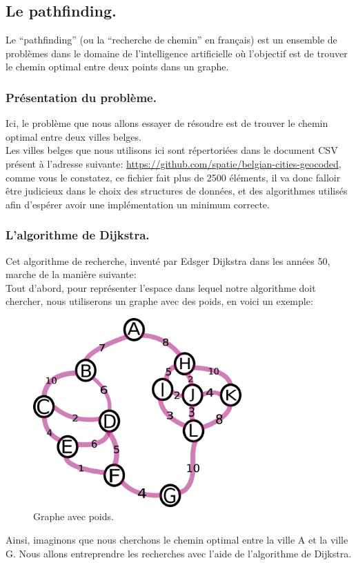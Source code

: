 \documentclass[a4paper, 12pt]{article}
\numberwithin{equation}{subsection}
\begin{document}
\subsection{Le pathfinding.}
Le ``pathfinding'' (ou la ``recherche de chemin'' en français) est un ensemble de problèmes dans le domaine de l'intelligence artificielle où l'objectif est de trouver le chemin optimal entre deux points dans un graphe. \\
\subsubsection{Présentation du problème.}
Ici, le problème que nous allons essayer de résoudre est de trouver le chemin optimal entre deux villes belges. \\

Les villes belges que nous utilisons ici sont répertoriées dans le document CSV présent à l'adresse suivante: \url{https://github.com/spatie/belgian-cities-geocoded},
comme vous le constatez, ce fichier fait plus de 2500 éléments, il va donc falloir être judicieux dans le choix des structures de données, et des algorithmes utilisés afin d'espérer avoir une implémentation un minimum correcte. \\[0.2cm]
\subsubsection{L'algorithme de Dijkstra.}
Cet algorithme de recherche, inventé par Edsger Dijkstra dans les années 50, marche de la manière suivante: \\

Tout d'abord, pour représenter l'espace dans lequel notre algorithme doit chercher, nous utiliserons un graphe avec des poids, en voici un exemple: \\
\begin{figure}[H]
  \centering
  \includegraphics[width=8.0cm]{imgs/numbered_graph.png}
  \caption{Graphe avec poids.}
\end{figure}
Ainsi, imaginons que nous cherchons le chemin optimal entre la ville A et la ville G. Nous allons entreprendre les recherches avec l'aide de l'algorithme de Dijkstra. \\
\end{document}
